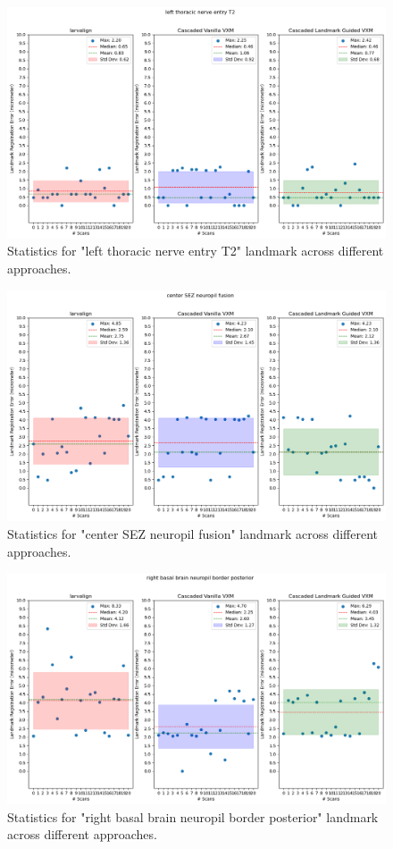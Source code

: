 \documentclass{report}
\begin{document}
\begin{figure}[h!]
	\centering
	\includegraphics[width=0.7\columnwidth]{resources/chapter5_fresh/output/left thoracic nerve entry T2.png}
	\caption{Statistics for "left thoracic nerve entry T2" landmark across different approaches.}
	\label{fig:landmark2}
\end{figure}

\begin{figure}[h!]
	\centering
	\includegraphics[width=0.7\columnwidth]{resources/chapter5_fresh/output/center SEZ neuropil fusion.png}
	\caption{Statistics for "center SEZ neuropil fusion" landmark across different approaches.}
	\label{fig:landmark3}
\end{figure}

\begin{figure}[h!]
	\centering
	\includegraphics[width=0.7\columnwidth]{resources/chapter5_fresh/output/right basal brain neuropil border posterior.png}
	\caption{Statistics for "right basal brain neuropil border posterior" landmark across different approaches.}
	\label{fig:landmark4}
\end{figure}
\end{document}
